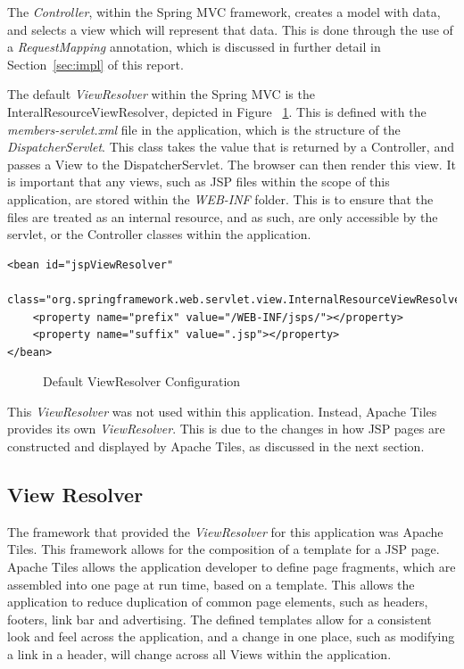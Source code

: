 The \textit{Controller}, within the Spring MVC framework, creates a model with data, and selects a view which will represent that data. This is done through the use of a \textit{RequestMapping} annotation, which is discussed in further detail in Section~\ref{sec:impl} of this report.

The default \textit{ViewResolver} within the Spring MVC is the InteralResourceViewResolver, depicted in Figure ~\ref{fig:defaultViewRes}. This is defined with the \textit{members-servlet.xml} file in the application, which is the structure of the \textit{DispatcherServlet}. This class takes the value that is returned by a Controller, and passes a View to the DispatcherServlet. The browser can then render this view. It is important that any views, such as JSP files within the scope of this application, are stored within the \textit{WEB-INF} folder. This is to ensure that the files are treated as an internal resource, and as such, are only accessible by the servlet, or the Controller classes within the application.

\begin{lstlisting}
<bean id="jspViewResolver"
	class="org.springframework.web.servlet.view.InternalResourceViewResolver">
	<property name="prefix" value="/WEB-INF/jsps/"></property>
	<property name="suffix" value=".jsp"></property>
</bean>
\end{lstlisting}
\begin{figure}[H]
\caption{Default ViewResolver Configuration}
\label{fig:defaultViewRes}
\end{figure}

This \textit{ViewResolver} was not used within this application. Instead, Apache Tiles provides its own \textit{ViewResolver}. This is due to the changes in how JSP pages are constructed and displayed by Apache Tiles, as discussed in the next section.

\subsection{View Resolver}

The framework that provided the \textit{ViewResolver} for this application was Apache Tiles. This framework allows for the composition of a template for a JSP page. Apache Tiles allows the application developer to define page fragments, which are assembled into one page at run time, based on a template. This allows the application to reduce duplication of common page elements, such as headers, footers, link bar and advertising.  The defined templates allow for a consistent look and feel across the application, and a change in one place, such as modifying a link in a header, will change across all Views within the application.

